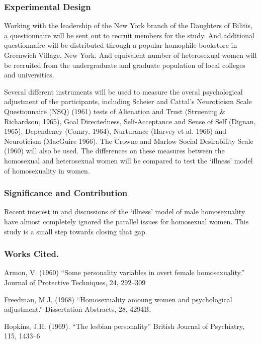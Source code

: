 \subsubsection{Experimental Design}
\label{experimentaldesign}

Working with the leadership of the New York branch of the Daughters of Bilitis, a questionnaire will be sent out to recruit members for the study. And additional questionnaire will be distributed through a popular homophile bookstore in Greenwich Village, New York. And equivalent number of heterosexual women will be recruited from the undergraduate and graduate population of local colleges and universities.

Several different instruments will be used to measure the overal psychological adjustment of the participants, including Scheier and Cattal's Neuroticism Scale Questionnaire (NSQ) (1961) tests of Alienation and Trust (Struening \& Richardson, 1965), Goal Directedness, Self-Acceptance and Sense of Self (Dignan, 1965), Dependency (Comry, 1964), Nurturance (Harvey et al. 1966) and Neuroticism (MacGuire 1966). The Crowne and Marlow Social Desirability Scale (1960) will also be used. The differences on these measures between the homosexual and heterosexual women will be compared to test the `illness' model of homosexuality in women.

\subsubsection{Significance and Contribution}
\label{significanceandcontribution}

Recent interest in and discussions of the `illness' model of male homosexuality have almost completely ignored the parallel issues for homosexual women. This study is a small step towards closing that gap.

\subsubsection{Works Cited.}
\label{workscited.}

Armon, V. (1960) “Some personality variables in overt female homosexuality.” Journal of Protective Techniques, 24, 292--309

Freedman, M.J. (1968) “Homosexuality amoung women and psychological adjustment.” Dissertation Abstracts, 28, 4294B.

Hopkins, J.H. (1969). “The lesbian personality” British Journal of Psychiatry, 115, 1433--6

